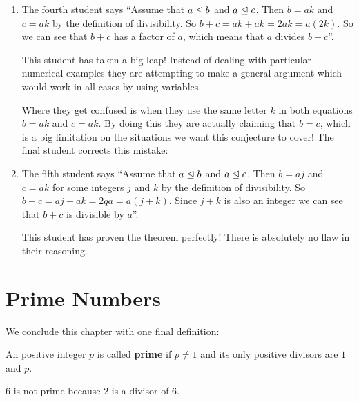 \begin{enumerate}
	\item The fourth student says ``Assume that $a \trianglelefteq b$ and $a \trianglelefteq c$.  Then $b = ak$ and $c=ak$ by the definition of divisibility.  So $b+c = ak + ak  = 2ak = a(2k)$.  So we can see that $b+c$ has a factor of $a$, which means that $a$ divides $b+c$''.
	
	\medskip
	
	This student has taken a big leap!  Instead of dealing with particular numerical examples they are attempting to make a general argument which would work in all cases by using variables.
	
	Where they get confused is when they use the same letter $k$ in both equations $b = ak$ and $c=ak$.  By doing this they are actually claiming that $b=c$, which is a big limitation on the situations we want this conjecture to cover!  The final student corrects this mistake:
	
	\item The fifth student says ``Assume that $a \trianglelefteq b$ and $a \trianglelefteq c$.  Then $b = aj$ and $c=ak$  for some integers $j$ and $k$ by the definition of divisibility.  So $b+c = aj + ak  = 2qa = a(j+k)$.  Since $j+k$ is also an integer we can see that $b+c$ is divisible by $a$''.
	
	\medskip
	
	This student has proven the theorem perfectly!  There is absolutely no flaw in their reasoning.
\end{enumerate} 

\section{Prime Numbers}
We conclude this chapter with one final definition:

\begin{definition}
	An positive integer $p$ is called \textbf{prime} if  $p \neq 1$ and its only positive divisors are $1$ and $p$.
\end{definition}

\begin{example}
	$6$ is not prime because $2$ is a divisor of $6$.
\end{example}

